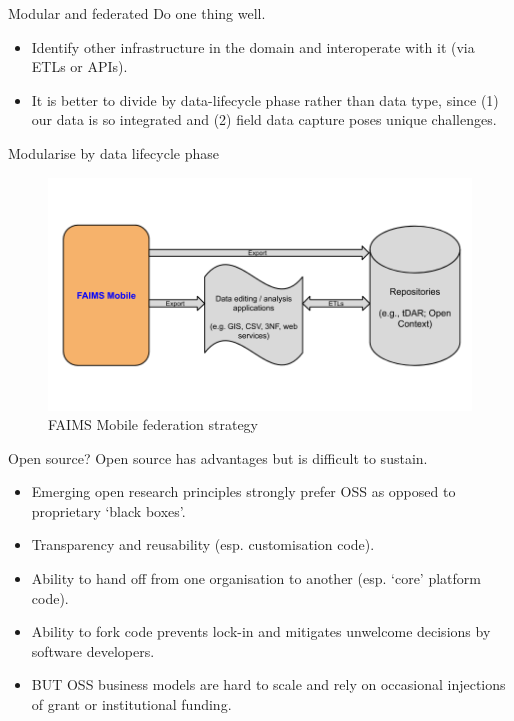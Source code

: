 \documentclass[aspectratio=169, 11pt]{beamer} %
\begin{document}
\begin{frame}{Modular and federated}
  Do one thing well.
      \begin{itemize}[label=\textbullet]
        \item Identify other infrastructure in the domain and interoperate with it (via ETLs or APIs).
        \item It is better to divide by data-lifecycle phase rather than data type, since (1) our data is so integrated and (2) field data capture poses unique challenges.
    \end{itemize}
\end{frame}

\begin{frame}{Modularise by data lifecycle phase}
 \begin{figure}[H]
    \centering
        \includegraphics[height=.75\textheight]{figures/FAIMS-federation.png}
        \caption{FAIMS Mobile federation strategy}
        \label{fig:figure13}
 \end{figure}
\end{frame}

\begin{frame}{Open source?}
  Open source has advantages but is difficult to sustain.
      \begin{itemize}[label=\textbullet]
        \item Emerging open research principles strongly prefer OSS as opposed to proprietary ‘black boxes’.
        \item Transparency and reusability (esp. customisation code).
        \item Ability to hand off from one organisation to another (esp. `core' platform code).
        \item Ability to fork code prevents lock-in and mitigates unwelcome decisions by software developers.
        \item BUT OSS business models are hard to scale and rely on occasional injections of grant or institutional funding.
    \end{itemize}
\end{frame}
\end{document}
